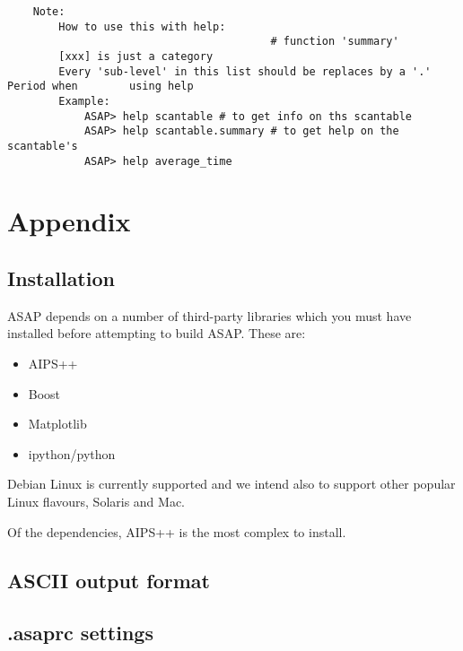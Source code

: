 \documentclass[11pt]{article}
\begin{document}
\begin{verbatim}
    Note:
        How to use this with help:
                                         # function 'summary'
        [xxx] is just a category
        Every 'sub-level' in this list should be replaces by a '.' Period when        using help
        Example:
            ASAP> help scantable # to get info on ths scantable
            ASAP> help scantable.summary # to get help on the scantable's
            ASAP> help average_time
\end{verbatim}



\section{Appendix}

\subsection{Installation}

ASAP depends on a number of third-party libraries which you must
have installed before attempting to build ASAP. These are:

\begin{itemize}
\item AIPS++
\item Boost
\item Matplotlib
\item ipython/python
\end{itemize}

Debian Linux is currently supported and we intend also
to support other popular Linux flavours, Solaris and Mac.

Of the dependencies, AIPS++ is the most complex to install.

\subsection{ASCII output format}

\subsection{.asaprc settings}
\end{document}
